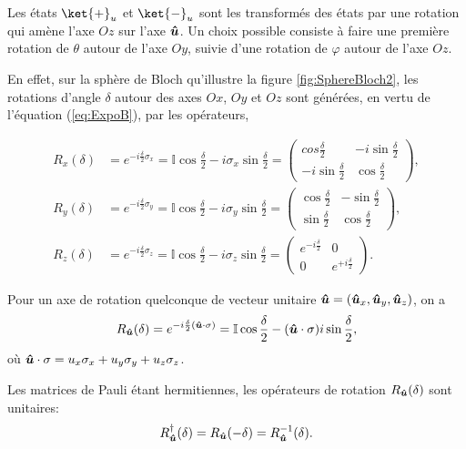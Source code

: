Les états $\ket{+}_{u}$ et $\ket{-}_{u}$ sont les transformés des états par une
rotation qui amène l'axe $Oz$ sur l'axe $\boldsymbol{\hat{u}}$. Un choix possible
consiste à faire une première rotation de $\theta$ autour de l'axe $Oy$, suivie
d'une rotation de $\varphi$ autour de l'axe $Oz$.

En effet, sur la sphère de Bloch qu'illustre la figure \ref{fig:SphereBloch2},
les rotations d'angle $\delta$ autour des axes $Ox$, $Oy$ et $Oz$ sont générées,
en vertu de l'équation (\ref{eq:ExpoB}), par les opérateurs,%

\begin{subequations}
\begin{align}
R_{x}(\delta)  &
=e^{-i\frac{\delta}{2}\sigma_{x}}=\mathbb{I}\cos\frac{\delta}{2}
-i\sigma_{x}\sin\frac{\delta}{2}=\begin{pmatrix}
cos\frac{\delta}{2} & -i\sin\frac{\delta}{2}\\
-i\sin\frac{\delta}{2} & \cos\frac{\delta}{2}
\end{pmatrix},\\
R_{y}(\delta)  &
=e^{-i\frac{\delta}{2}\sigma_{y}}=\mathbb{I}\cos\frac{\delta}{2}
-i\sigma_{y}\sin\frac{\delta}{2}=\begin{pmatrix}
\cos\frac{\delta}{2} & -\sin\frac{\delta}{2}\\
\sin\frac{\delta}{2} & \cos\frac{\delta}{2}
\end{pmatrix},\\
R_z(\delta)  &
=e^{-i\frac{\delta}{2}\sigma_z}=\mathbb{I}\cos\frac{\delta}{2}
-i\sigma_z\sin\frac{\delta}{2}=\begin{pmatrix}
e^{-i\frac{\delta}{2}} & 0\\
0 & e^{+i\frac{\delta}{2}}
\end{pmatrix}.
\end{align}%
\end{subequations}%

Pour un axe de rotation quelconque de vecteur unitaire $\bls{\hat{u}}%
=(\bls{\hat{u}}_{x},\bls{\hat{u}}_{y},\bls{\hat{u}}_z)$,
on a%
\begin{equation}
R_{\boldsymbol{\hat{u}}}(\delta)=e^{-i\frac{\delta}{2}(\boldsymbol{\hat{u}}
\cdot\sigma
)}=\mathbb{I}\cos\frac{\delta}{2}-(\boldsymbol{\hat{u}}\cdot\sigma)i\sin\frac
{\delta}{2},
\end{equation}
où
$\boldsymbol{\hat{u}}\cdot\sigma=u_{x}\sigma_{x}+u_{y}\sigma_{y}+u_z\sigma_z
$.

Les matrices de Pauli étant hermitiennes, les opérateurs de rotation
$R_{\boldsymbol{\hat{u}}}(\delta)$ sont unitaires:
\begin{equation}
R_{\boldsymbol{\hat{u}}}^{\dagger}(\delta)=R_{\boldsymbol{\hat{u}}}(-\delta
)=R_{\boldsymbol{\hat{u}}}^{-1}(\delta).
\end{equation}


